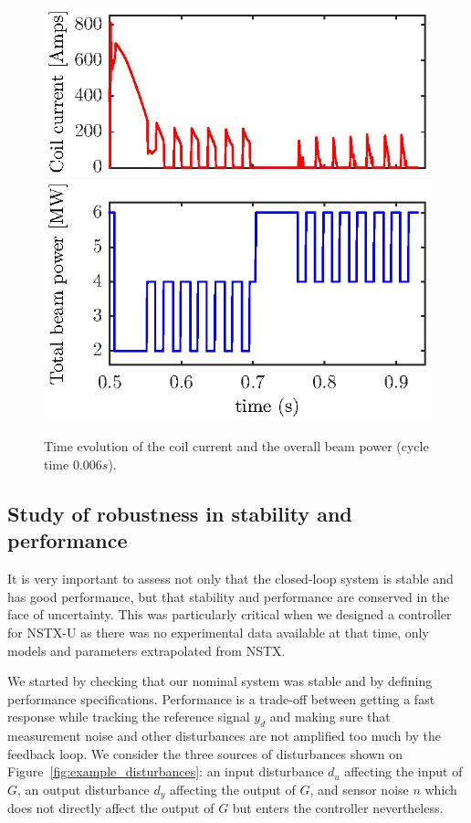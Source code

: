 \documentclass[12pt,lot, lof]{puthesis}
\begin{document}
\begin{figure}[htbp]
	\centering
	\includegraphics[width=0.7 \linewidth]{fig19a}  \\[-0.5em]
	\includegraphics[width=0.7 \linewidth]{fig19b} 
	\caption{Time evolution of the coil current and the overall beam power (cycle time $0.006 s$). }
	\label{res2}
\end{figure}

\subsection{Study of robustness in stability and performance}

It is very important to assess not only that the closed-loop system is stable and has good performance, but that stability and performance are conserved in the face of uncertainty.
This was particularly critical when we designed a controller for NSTX-U as there was no experimental data available at that time, only models and parameters extrapolated from NSTX.

We started by checking that our nominal system was stable and by defining performance specifications.
Performance is a trade-off between getting a fast response while tracking the reference signal $y_d$ and making sure that measurement noise and other disturbances are not amplified too much by the feedback loop.
We consider the three sources of disturbances shown on Figure~\ref{fig:example_disturbances}: an input disturbance $d_u$ affecting the input of $G$, an output disturbance $d_y$ affecting the output of $G$, and sensor noise $n$ which does not directly affect the output of $G$ but enters the controller nevertheless.
\end{document}
